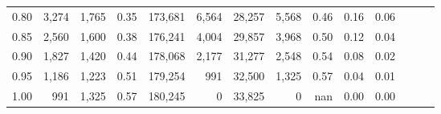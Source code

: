 \begin{tabular}{rrrrrrrrrrrrrr}
0.80 &   3,274 &  1,765 &  0.35 &  173,681 &    6,564 &  28,257 &   5,568 &  0.46 &  0.16 &      0.06 \\
0.85 &   2,560 &  1,600 &  0.38 &  176,241 &    4,004 &  29,857 &   3,968 &  0.50 &  0.12 &      0.04 \\
0.90 &   1,827 &  1,420 &  0.44 &  178,068 &    2,177 &  31,277 &   2,548 &  0.54 &  0.08 &      0.02 \\
0.95 &   1,186 &  1,223 &  0.51 &  179,254 &      991 &  32,500 &   1,325 &  0.57 &  0.04 &      0.01 \\
1.00 &     991 &  1,325 &  0.57 &  180,245 &        0 &  33,825 &       0 &   nan &  0.00 &      0.00 \\
\bottomrule
\end{tabular}

